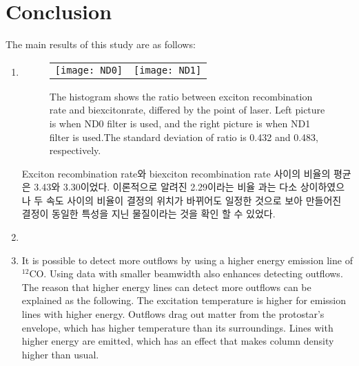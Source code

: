 \newpage

\section{Conclusion}
The main results of this study are as follows:
\begin{enumerate} 
	\item
	
\begin{figure}[h!]
		\begin{center}
			\begin{tabular}{cc}
				\texttt{[image: ND0]} &
				\texttt{[image: ND1]}
			\end{tabular}
			\caption{The histogram shows the ratio between exciton recombination rate and biexcitonrate, differed by the point of laser. Left picture is when ND0 filter is used, and the right picture is when ND1 filter is used.The standard deviation of ratio is 0.432 and 0.483, respectively. }	
			\label{fig:FIR221}
		\end{center}
	\end{figure}
	Exciton recombination rate와 biexciton recombination rate 사이의 비율의 평균은 3.43와 3.30이었다. 이론적으로 알려진 2.29이라는 비율\cite{chen2018room} 과는 다소 상이하였으나 두 속도 사이의 비율이 결정의 위치가 바뀌어도 일정한 것으로 보아 만들어진 결정이 동일한 특성을 지닌 물질이라는 것을 확인 할 수 있었다.  
	\item 
	
	
	\item It is possible to detect more outflows by using a higher energy emission line of $^{12}$CO. Using data with smaller beamwidth also enhances detecting outflows. The reason that higher energy lines can detect more outflows can be explained as the following. The excitation temperature is higher for emission lines with higher energy. Outflows drag out matter from the protostar's envelope, which has higher temperature than its surroundings. Lines with higher energy are emitted, which has an effect that makes column density higher than usual.	
\end{enumerate}